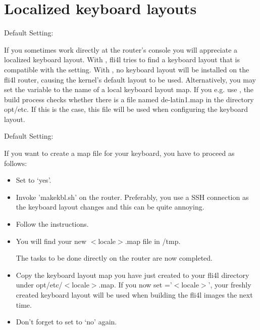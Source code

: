 
\section{Localized keyboard layouts}

\begin{description}

  
  Default Setting: 

  If you sometimes work directly at the router's console you will appreciate a
  localized keyboard layout. With , fli4l tries
  to find a keyboard layout that is compatible with the  setting.
  With , no keyboard layout will be installed on the
  fli4l router, causing the kernel's default layout to be used. Alternatively,
  you may set the variable to the name of a local keyboard layout map. If you
  e.g. use , the build process checks whether
  there is a file named de-latin1.map in the directory opt/etc. If this is the
  case, this file will be used when configuring the keyboard layout.

  
  Default Setting: 

  If you want to create a map file for your keyboard, you have to proceed as
  follows:

\begin{itemize}

  \item Set  to `yes'.

  \item Invoke 'makekbl.sh' on the router. Preferably, you use a SSH connection
  as the keyboard layout changes and this can be quite annoying.

  \item Follow the instructions.

  \item You will find your new $<$locale$>$.map file in /tmp.

  The tasks to be done directly on the router are now completed.

  \item Copy the keyboard layout map you have just created to your fli4l
  directory under opt/etc/$<$locale$>$.map. If you now set
  ='$<$locale$>$', your freshly created keyboard layout
  will be used when building the fli4l images the next time.

  \item Don't forget to set  to `no' again.

\end{itemize}

\end{description}
